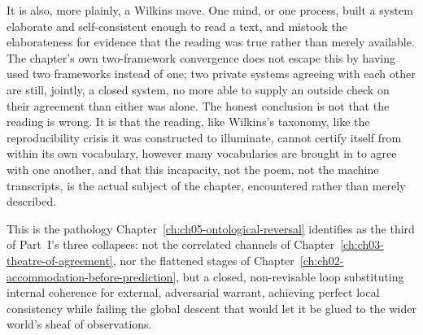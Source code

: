 It is also, more plainly, a Wilkins move. One mind, or one process, built a system elaborate and self-consistent enough to read a text, and mistook the elaborateness for evidence that the reading was true rather than merely available. The chapter's own two-framework convergence does not escape this by having used two frameworks instead of one; two private systems agreeing with each other are still, jointly, a closed system, no more able to supply an outside check on their agreement than either was alone. The honest conclusion is not that the reading is wrong. It is that the reading, like Wilkins's taxonomy, like the reproducibility crisis it was constructed to illuminate, cannot certify itself from within its own vocabulary, however many vocabularies are brought in to agree with one another, and that this incapacity, not the poem, not the machine transcripts, is the actual subject of the chapter, encountered rather than merely described.

This is the pathology Chapter~\ref{ch:ch05-ontological-reversal} identifies as the third of Part~I's three collapses: not the correlated channels of Chapter~\ref{ch:ch03-theatre-of-agreement}, nor the flattened stages of Chapter~\ref{ch:ch02-accommodation-before-prediction}, but a closed, non-revisable loop substituting internal coherence for external, adversarial warrant, achieving perfect local consistency while failing the global descent that would let it be glued to the wider world's sheaf of observations.
